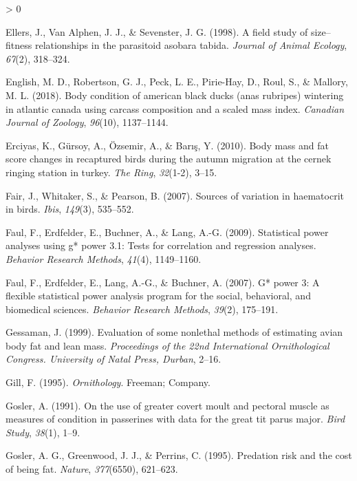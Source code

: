\documentclass[
]{article}
\newlength{\cslhangindent}
\newenvironment{CSLReferences}[2] %
 {%
  \setlength{\parindent}{0pt}
  \ifodd #1 \everypar{\setlength{\hangindent}{\cslhangindent}}\ignorespaces\fi
  \ifnum #2 > 0
  \setlength{\parskip}{#2\baselineskip}
  \fi
 }%
 {}
\begin{document}
\begin{CSLReferences}{1}{0}
\leavevmode\hypertarget{ref-ellers1998field}{}%
Ellers, J., Van Alphen, J. J., \& Sevenster, J. G. (1998). A field study
of size--fitness relationships in the parasitoid asobara tabida.
\emph{Journal of Animal Ecology}, \emph{67}(2), 318--324.

\leavevmode\hypertarget{ref-english2018body}{}%
English, M. D., Robertson, G. J., Peck, L. E., Pirie-Hay, D., Roul, S.,
\& Mallory, M. L. (2018). Body condition of american black ducks (anas
rubripes) wintering in atlantic canada using carcass composition and a
scaled mass index. \emph{Canadian Journal of Zoology}, \emph{96}(10),
1137--1144.

\leavevmode\hypertarget{ref-erciyas2010body}{}%
Erciyas, K., Gürsoy, A., Özsemir, A., \& Barış, Y. (2010). Body mass and
fat score changes in recaptured birds during the autumn migration at the
cernek ringing station in turkey. \emph{The Ring}, \emph{32}(1-2),
3--15.

\leavevmode\hypertarget{ref-fair2007sources}{}%
Fair, J., Whitaker, S., \& Pearson, B. (2007). Sources of variation in
haematocrit in birds. \emph{Ibis}, \emph{149}(3), 535--552.

\leavevmode\hypertarget{ref-faul2009statistical}{}%
Faul, F., Erdfelder, E., Buchner, A., \& Lang, A.-G. (2009). Statistical
power analyses using g* power 3.1: Tests for correlation and regression
analyses. \emph{Behavior Research Methods}, \emph{41}(4), 1149--1160.

\leavevmode\hypertarget{ref-faul2007g}{}%
Faul, F., Erdfelder, E., Lang, A.-G., \& Buchner, A. (2007). G* power 3:
A flexible statistical power analysis program for the social,
behavioral, and biomedical sciences. \emph{Behavior Research Methods},
\emph{39}(2), 175--191.

\leavevmode\hypertarget{ref-gessaman1999evaluation}{}%
Gessaman, J. (1999). Evaluation of some nonlethal methods of estimating
avian body fat and lean mass. \emph{Proceedings of the 22nd
International Ornithological Congress. University of Natal Press,
Durban}, 2--16.

\leavevmode\hypertarget{ref-gill1995ornithology}{}%
Gill, F. (1995). \emph{Ornithology}. Freeman; Company.

\leavevmode\hypertarget{ref-gosler1991use}{}%
Gosler, A. (1991). On the use of greater covert moult and pectoral
muscle as measures of condition in passerines with data for the great
tit parus major. \emph{Bird Study}, \emph{38}(1), 1--9.

\leavevmode\hypertarget{ref-gosler1995predation}{}%
Gosler, A. G., Greenwood, J. J., \& Perrins, C. (1995). Predation risk
and the cost of being fat. \emph{Nature}, \emph{377}(6550), 621--623.


\end{CSLReferences}
\end{document}
